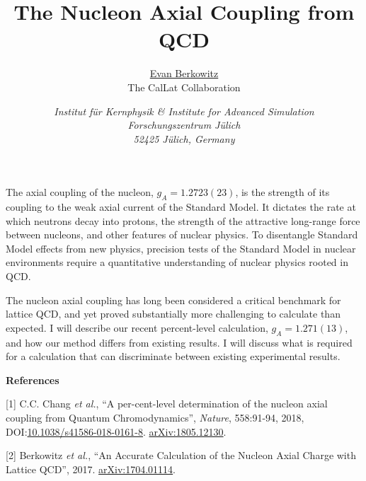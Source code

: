 \documentclass[a4paper,12pt]{article}                               %
\begin{document}
\title{The Nucleon Axial Coupling from QCD}

\author{\underline{Evan Berkowitz}\\ The CalLat Collaboration}
\date{\small \it
    Institut f\"{u}r Kernphysik \& Institute for Advanced Simulation \\ Forschungszentrum J\"{u}lich \\ 52425 J\"{u}lich, Germany
}

\maketitle

The axial coupling of the nucleon, $g_A=1.2723(23)$, is the strength of its coupling to the weak axial current of the Standard Model.
It dictates the rate at which neutrons decay into protons, the strength of the attractive long-range force between nucleons, and other features of nuclear physics.
To disentangle Standard Model effects from new physics, precision tests of the Standard Model in nuclear environments require a quantitative understanding of nuclear physics rooted in QCD.

The nucleon axial coupling has long been considered a critical benchmark for lattice QCD, and yet proved substantially more challenging to calculate than expected.
I will describe our recent percent-level calculation, $g_A=1.271(13)$, and how our method differs from existing results.
I will discuss what is required for a calculation that can discriminate between existing experimental results.


\vspace{16pt}
{\large \bf References}
\vspace{16pt}

\setlength{\parindent}{0cm}
\setlength{\parskip}{16pt}
[1] C.C. Chang \emph{et al.}, ``A per-cent-level determination of the nucleon axial coupling from Quantum Chromodynamics'', \emph{Nature}, 558:91-94, 2018, DOI:\href{https://doi.org/10.1038/s41586-018-0161-8}{10.1038/s41586-018-0161-8}.  \href{https://arxiv.org/abs/1805.12130}{arXiv:1805.12130}.

[2] Berkowitz \emph{et al.}, ``An Accurate Calculation of the Nucleon Axial Charge with Lattice QCD'', 2017.  \href{https://arxiv.org/abs/1704.01114}{arXiv:1704.01114}.

%
% 
% 
\end{document}
